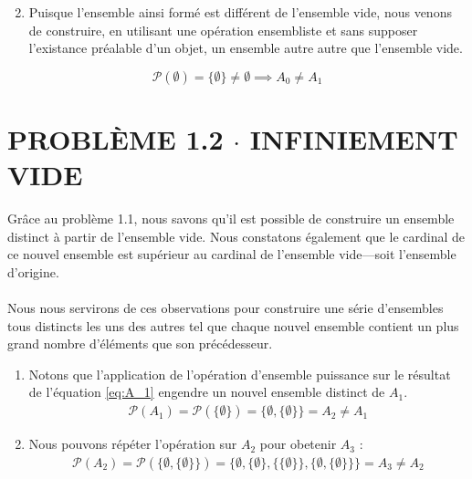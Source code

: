 \documentclass[8pt]{report}
\begin{document}
    \begin{enumerate}
        \setcounter{enumi}{1}
        \item Puisque l'ensemble ainsi formé est différent de l'ensemble vide, nous venons de construire, 
            en utilisant une opération ensembliste et sans supposer l'existance préalable d'un objet, 
            un ensemble autre autre que l'ensemble vide. 
    \end{enumerate}

    
    \begin{Reponse}{}{}
                \[ \mathcal{P}(\emptyset) = \{ \emptyset \} \neq \emptyset \implies A_0 \neq A_1\] 
    \end{Reponse}



\section*{\textnormal{PROBLÈME 1.2 \;\;\;\; $\cdot$ \;\;\;\; INFINIEMENT VIDE }}   
    \noindent Grâce au problème 1.1, nous savons qu'il est possible de construire un ensemble distinct à 
    partir de l'ensemble vide. Nous constatons également que le cardinal de ce nouvel ensemble est 
    supérieur au cardinal de l'ensemble vide—soit l'ensemble d'origine. \\\\ 
    Nous nous servirons de ces observations pour construire une série d'ensembles tous distincts les uns des 
    autres tel que chaque nouvel ensemble contient un plus grand nombre d'éléments que son précédesseur. 
    \begin{enumerate}
        \item Notons que l'application de l'opération d'ensemble puissance sur le résultat de l'équation  
        \eqref{eq:A_1} engendre un nouvel ensemble distinct de $A_1$. 
        \begin{align}
            \label{eq:EmptysetA_2}
        \mathcal{P}(A_1) = \mathcal{P}(\{ \emptyset \}) = 
        \{ \emptyset, \{ \emptyset \} \} = A_2 \neq A_1 
        \end{align}

       \item Nous pouvons répéter l'opération sur $A_2$ pour obetenir $A_3$ :
        \begin{align}
            \label{eq:EmptysetA_3}
            \mathcal{P}(A_2) = 
            \mathcal{P}(\{ \emptyset, \{ \emptyset \}\}) = 
            \{ \emptyset, \{ \emptyset \}, \{\{ \emptyset \}\}, \{\emptyset, \{\emptyset\}  \} \} = 
            A_3 \neq A_2 
        \end{align}
    \end{enumerate}
\end{document}

